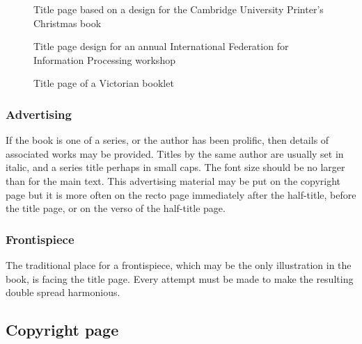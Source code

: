\documentclass[10pt,letterpaper,extrafontsizes]{memoir}
\begin{document}
\begin{figure}
\centering
\begin{showtitle}
\titleWH
\end{showtitle}
\caption{Title page based on a design for the Cambridge University 
Printer's Christmas book } \label{fig:titleWH}
\end{figure}


\begin{figure}
\centering
\begin{showtitle}
\titleGP
\end{showtitle}
\caption{Title page design for an annual International Federation for 
    Information Processing workshop} \label{fig:titleGP}
\end{figure}


\begin{figure}
\centering
{\titleRB}
\caption{Title page of a Victorian booklet} \label{fig:titleRB}
\end{figure}



\subsubsection{Advertising}

    If the book is one of a series, or the author has been prolific, then
details of associated works may be provided. Titles by the same author
are usually set in italic, and a series title perhaps in small caps. The
font size should be no larger than for the main text. This advertising material
may be put on the copyright page but it is more often on the recto page
immediately after the half-title, before the title page, or on the verso of 
the half-title page.

\subsubsection{Frontispiece}

    The traditional place for a frontispiece, 
which may be the only
illustration in the book, is facing the title page. Every attempt must be
made to make the resulting double spread harmonious.

\subsection{Copyright page}
\end{document}
